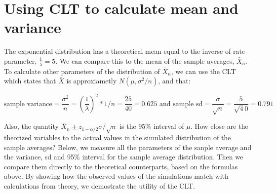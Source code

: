 \documentclass[]{article}
\begin{document}
\section{Using CLT to calculate mean and
variance}\label{using-clt-to-calculate-mean-and-variance}

The exponential distribution has a theoretical mean equal to the inverse
of rate parameter, \(\frac{1}{\lambda}=5\). We can compare this to the
mean of the sample averages, \(\bar X_n\). To calculate other parameters
of the distribution of \(\bar X_n\), we can use the CLT which states
that \(\bar X\) is approxiametly \(N(\mu, \sigma^2 / n)\), and that:

\[ \text{sample variance} = \frac{\sigma^2}{n} = (\frac{1}{\lambda})^2 * 1/n = \frac{25}{40} =  0.625    
\text{  and sample sd} = \frac{\sigma}{\sqrt n} = \frac{5}{\sqrt 40} = 0.791 \]

Also, the quantity \(\bar X_n \pm z_{1-\alpha/2}\sigma / \sqrt{n}\) is
the 95\% interval of \(\mu\). How close are the theorized variables to
the actual values in the simulated distribution of the sample averages?
Below, we measure all the parameters of the sanple average and the
variance, sd and 95\% interval for the sample average distribution. Then
we compare them directly to the theoretical counterparts, based on the
formulas above. By showing how the observed values of the simulations
match with calculations from theory, we demostrate the utility of the
CLT.
\end{document}
